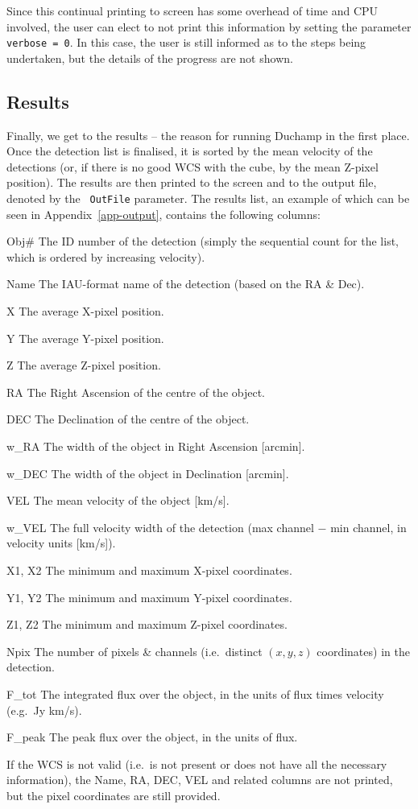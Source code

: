 \documentclass[12pt,a4paper]{article}
\newcommand{\eg}{e.g.\ }
\newcommand{\ie}{i.e.\ }
\newcommand{\entrylabel}[1]{\mbox{\textsf{\bf{#1:}}}\hfil}
\newenvironment{entry}
        {\begin{list}{}%
                {\renewcommand{\makelabel}{\entrylabel}%
                        \setlength{\labelwidth}{30mm}%
                        \setlength{\labelsep}{5pt}%
                        \setlength{\itemsep}{2pt}%
                        \setlength{\parsep}{2pt}%
                        \setlength{\leftmargin}{35mm}%
                }%
        }%
{\end{list}}
\begin{document}
Since this continual printing to screen has some overhead of time and
CPU involved, the user can elect to not print this information by
setting the parameter {\tt verbose = 0}. In this case, the user is
still informed as to the steps being undertaken, but the details of
the progress are not shown.

\subsection{Results}

Finally, we get to the results -- the reason for running Duchamp in
the first place. Once the detection list is finalised, it is sorted by
the mean velocity of the detections (or, if there is no good WCS with
the cube, by the mean Z-pixel position). The results are then
printed to the screen and to the output file, denoted by the {\tt
OutFile} parameter. The results list, an example of which can be seen
in Appendix~\ref{app-output}, contains the following columns:

\begin{entry}
\item[Obj\#] The ID number of the detection (simply the sequential
  count for the list, which is ordered by increasing velocity).
\item[Name] The IAU-format name of the detection (based on the RA \&
Dec).
\item[X] The average X-pixel position.
\item[Y] The average Y-pixel position.
\item[Z] The average Z-pixel position.
\item[RA] The Right Ascension of the centre of the object.
\item[DEC] The Declination of the centre of the object.
\item[w\_RA] The width of the object in Right Ascension [arcmin].
\item[w\_DEC] The width of the object in Declination [arcmin].
\item[VEL] The mean velocity of the object [km/s].
\item[w\_VEL] The full velocity width of the detection (max channel
  $-$ min channel, in velocity units [km/s]).
\item[X1, X2] The minimum and maximum X-pixel coordinates.
\item[Y1, Y2] The minimum and maximum Y-pixel coordinates.
\item[Z1, Z2] The minimum and maximum Z-pixel coordinates.
\item[Npix] The number of pixels \& channels (\ie distinct $(x,y,z)$
  coordinates) in the detection.
\item[F\_tot] The integrated flux over the object, in the units of
  flux times velocity (\eg Jy km/s).
\item[F\_peak] The peak flux over the object, in the units of flux.
\end{entry}
If the WCS is not valid (\ie is not present or does not have all the
necessary information), the Name, RA, DEC, VEL and related columns are not
printed, but the pixel coordinates are still provided.
\end{document}
